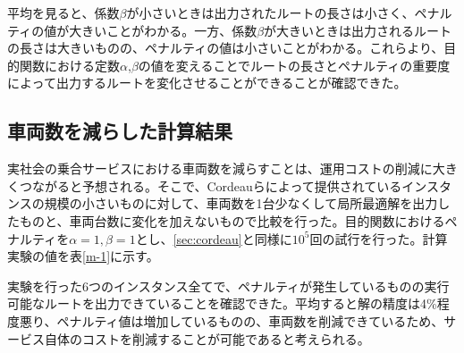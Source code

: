 平均を見ると、係数$\beta$が小さいときは出力されたルートの長さは小さく、ペナルティの値が大きいことがわかる。一方、係数$\beta$が大きいときは出力されるルートの長さは大きいものの、ペナルティの値は小さいことがわかる。これらより、目的関数における定数$\alpha$,$\beta$の値を変えることでルートの長さとペナルティの重要度によって出力するルートを変化させることができることが確認できた。

\subsection{車両数を減らした計算結果}
実社会の乗合サービスにおける車両数を減らすことは、運用コストの削減に大きくつながると予想される。そこで、Cordeauらによって提供されているインスタンスの規模の小さいものに対して、車両数を1台少なくして局所最適解を出力したものと、車両台数に変化を加えないもので比較を行った。目的関数におけるペナルティを$\alpha=1,\beta=1$とし、\ref{sec:cordeau}と同様に$10^5$回の試行を行った。計算実験の値を表\ref{m-1}に示す。

実験を行った6つのインスタンス全てで、ペナルティが発生しているものの実行可能なルートを出力できていることを確認できた。平均すると解の精度は4\%程度悪り、ペナルティ値は増加しているものの、車両数を削減できているため、サービス自体のコストを削減することが可能であると考えられる。




